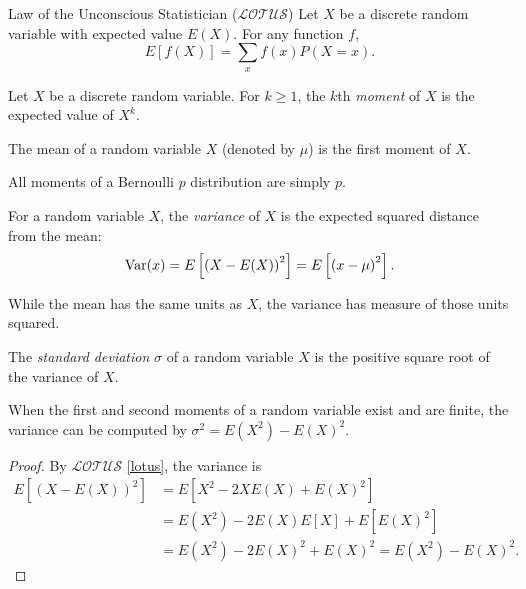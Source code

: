 \begin{thm}{Law of the Unconscious Statistician ($\mathcal{LOTUS}$)}{\label{lotus}}\proofbreak
    Let $X$ be a discrete random variable with expected value $E(X)$. For any function $f$, \[E[f(X)] = \sum_{x}f(x)P(X=x).\]
\end{thm}

\begin{defn}
    Let $X$ be a discrete random variable. For $k \geq 1$, the $k$th \emph{moment} of $X$ is the expected value of $X^k$.
\end{defn}

\begin{rmk}
    The mean of a random variable $X$ (denoted by $\mu$) is the first moment of $X$.
\end{rmk}

\begin{exmp}
    All moments of a Bernoulli $p$ distribution are simply $p$.
\end{exmp}

\begin{defn}
    For a random variable $X$, the \emph{variance} of $X$ is the expected squared distance from the mean: \[\operatorname{Var}(x) = E\left[\left(X-E(X)\right)^2\right] = E\left[\left(x - \mu\right)^2\right].\]
\end{defn}

\begin{rmk}
    While the mean has the same units as $X$, the variance has measure of those units squared.
\end{rmk}

\begin{defn}
    The \emph{standard deviation} $\sigma$ of a random variable $X$ is the positive square root of the variance of $X$.
\end{defn}

\begin{prop}
    When the first and second moments of a random variable exist and are finite, the variance can be computed by $\sigma^2 = E(X^2) - E(X)^2$.
\end{prop}

\begin{proof}
    By $\mathcal{LOTUS}$ \ref{lotus}, the variance is
    \begin{align*}
        E\left[(X-E(X))^2\right] &= E\left[X^2 - 2XE(X) + E(X)^2\right] \\
        &= E(X^2) - 2E(X)E\left[X\right] + E\left[E(X)^2\right] \\
        &= E(X^2) - 2E(X)^2 + E(X)^2 = E(X^2) - E(X)^2.
    \end{align*}
\end{proof}


